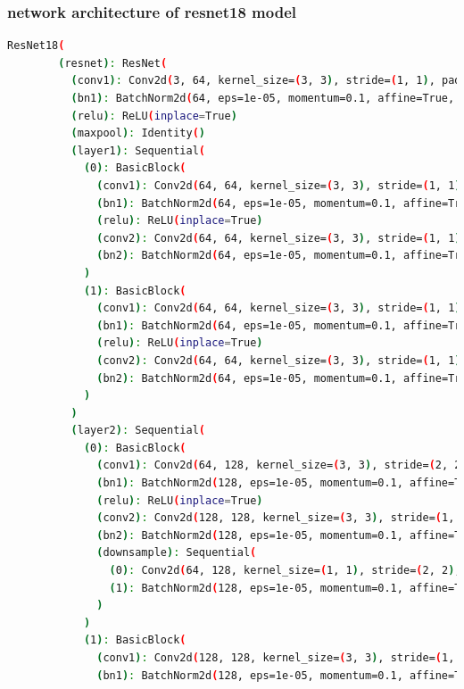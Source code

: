 \documentclass[a4paper, 12pt]{article}
\begin{document}
\subsubsection{network architecture of resnet18 model}
\begin{lstlisting}[language=sh]
    ResNet18(
        (resnet): ResNet(
          (conv1): Conv2d(3, 64, kernel_size=(3, 3), stride=(1, 1), padding=(3, 3), bias=False)
          (bn1): BatchNorm2d(64, eps=1e-05, momentum=0.1, affine=True, track_running_stats=True)
          (relu): ReLU(inplace=True)
          (maxpool): Identity()
          (layer1): Sequential(
            (0): BasicBlock(
              (conv1): Conv2d(64, 64, kernel_size=(3, 3), stride=(1, 1), padding=(1, 1), bias=False)
              (bn1): BatchNorm2d(64, eps=1e-05, momentum=0.1, affine=True, track_running_stats=True)
              (relu): ReLU(inplace=True)
              (conv2): Conv2d(64, 64, kernel_size=(3, 3), stride=(1, 1), padding=(1, 1), bias=False)
              (bn2): BatchNorm2d(64, eps=1e-05, momentum=0.1, affine=True, track_running_stats=True)
            )
            (1): BasicBlock(
              (conv1): Conv2d(64, 64, kernel_size=(3, 3), stride=(1, 1), padding=(1, 1), bias=False)
              (bn1): BatchNorm2d(64, eps=1e-05, momentum=0.1, affine=True, track_running_stats=True)
              (relu): ReLU(inplace=True)
              (conv2): Conv2d(64, 64, kernel_size=(3, 3), stride=(1, 1), padding=(1, 1), bias=False)
              (bn2): BatchNorm2d(64, eps=1e-05, momentum=0.1, affine=True, track_running_stats=True)
            )
          )
          (layer2): Sequential(
            (0): BasicBlock(
              (conv1): Conv2d(64, 128, kernel_size=(3, 3), stride=(2, 2), padding=(1, 1), bias=False)
              (bn1): BatchNorm2d(128, eps=1e-05, momentum=0.1, affine=True, track_running_stats=True)
              (relu): ReLU(inplace=True)
              (conv2): Conv2d(128, 128, kernel_size=(3, 3), stride=(1, 1), padding=(1, 1), bias=False)
              (bn2): BatchNorm2d(128, eps=1e-05, momentum=0.1, affine=True, track_running_stats=True)
              (downsample): Sequential(
                (0): Conv2d(64, 128, kernel_size=(1, 1), stride=(2, 2), bias=False)
                (1): BatchNorm2d(128, eps=1e-05, momentum=0.1, affine=True, track_running_stats=True)
              )
            )
            (1): BasicBlock(
              (conv1): Conv2d(128, 128, kernel_size=(3, 3), stride=(1, 1), padding=(1, 1), bias=False)
              (bn1): BatchNorm2d(128, eps=1e-05, momentum=0.1, affine=True, track_running_stats=True)

\end{lstlisting}
\end{document}
